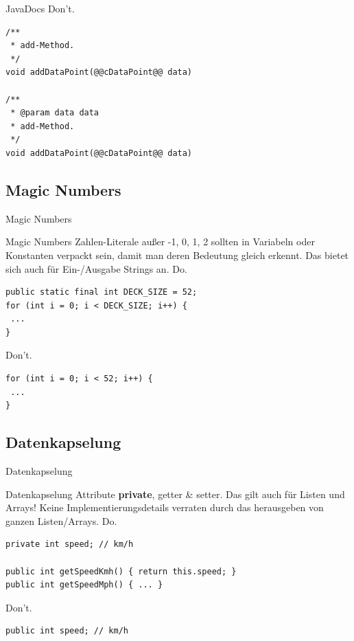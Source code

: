 \documentclass[aspectratio=169]{beamer}
\begin{document}
\begin{frame}[fragile]
  \begin{block}{JavaDocs}
    \color{alertcolor}Don't.\color{FGround}
    \begin{lstlisting}[numbers=none]
/** 
 * add-Method.  
 */ 
void addDataPoint(@@cDataPoint@@ data)

/** 
 * @param data data
 * add-Method.  
 */ 
void addDataPoint(@@cDataPoint@@ data)
    \end{lstlisting}
  \end{block}
\end{frame}

\subsection{Magic Numbers}
\begin{frame}[fragile]{Magic Numbers}
  \begin{block}{Magic Numbers}
    Zahlen-Literale außer -1, 0, 1, 2 sollten in Variabeln oder Konstanten verpackt sein, damit man deren Bedeutung gleich erkennt.
    Das bietet sich auch für Ein-/Ausgabe Strings an. \linebreak
    \pause
    \color{nicegreen}Do.\color{FGround}
    \begin{lstlisting}[numbers=none]
public static final int DECK_SIZE = 52; 
for (int i = 0; i < DECK_SIZE; i++) { 
 ...
}
    \end{lstlisting}
    \pause
    \color{alertcolor}Don't.\color{FGround}
    \begin{lstlisting}[numbers=none]
for (int i = 0; i < 52; i++) { 
 ...
} 
    \end{lstlisting}
  \end{block}
\end{frame}

\subsection{Datenkapselung}
\begin{frame}[fragile]{Datenkapselung}
  \begin{block}{Datenkapselung}
    Attribute \textbf{private}, getter \& setter. Das gilt auch für Listen und Arrays! 
    Keine Implementierungsdetails verraten durch das herausgeben von ganzen Listen/Arrays. \linebreak
    \pause
    \color{nicegreen}Do.\color{FGround}
    \begin{lstlisting}[numbers=none]
private int speed; // km/h

public int getSpeedKmh() { return this.speed; }
public int getSpeedMph() { ... }
    \end{lstlisting}
    \pause
    \color{alertcolor}Don't.\color{FGround}
    \begin{lstlisting}[numbers=none]
public int speed; // km/h
    \end{lstlisting}
  \end{block}
\end{frame}
\end{document}
